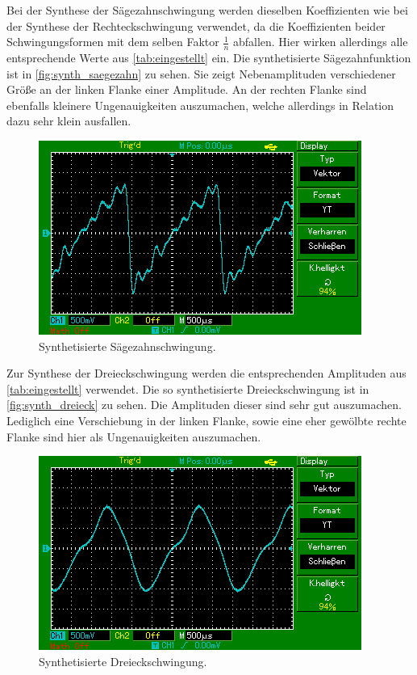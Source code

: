 Bei der Synthese der Sägezahnschwingung werden dieselben Koeffizienten wie bei der Synthese der Rechteckschwingung verwendet, da
die Koeffizienten beider Schwingungsformen mit dem selben Faktor $\frac{1}{n}$ abfallen. Hier wirken allerdings alle 
entsprechende Werte aus \autoref{tab:eingestellt} ein. Die synthetisierte Sägezahnfunktion 
ist in \autoref{fig:synth_saegezahn} zu sehen. Sie zeigt Nebenamplituden verschiedener Größe an der linken Flanke einer Amplitude.
An der rechten Flanke sind ebenfalls kleinere Ungenauigkeiten auszumachen, welche allerdings in Relation dazu sehr klein ausfallen.
\begin{figure}
  \centering
  \includegraphics{content/MAP001.png}
  \caption{Synthetisierte Sägezahnschwingung.}
  \label{fig:synth_saegezahn}
\end{figure}

Zur Synthese der Dreieckschwingung werden die entsprechenden Amplituden aus \autoref{tab:eingestellt} verwendet.
Die so synthetisierte Dreieckschwingung ist in \autoref{fig:synth_dreieck} zu sehen. Die Amplituden dieser sind sehr gut auszumachen.
Lediglich eine Verschiebung in der linken Flanke, sowie eine eher gewölbte rechte Flanke sind hier als Ungenauigkeiten auszumachen.
\begin{figure}
  \centering
  \includegraphics{content/MAP003.png}
  \caption{Synthetisierte Dreieckschwingung.}
  \label{fig:synth_dreieck}
\end{figure}